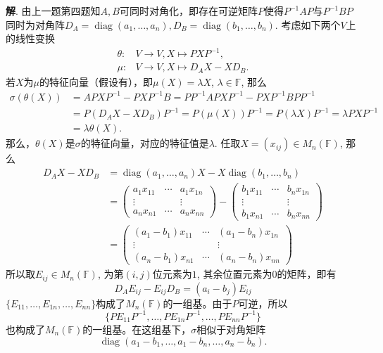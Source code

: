 {\bf 解}. 由上一题第四题知$A,B$可同时对角化，即存在可逆矩阵$P$使得$P^{-1}AP$与$P^{-1}BP$同时为对角阵$D_A = \operatorname{diag}(a_1, \ldots, a_n), D_B = \operatorname{diag}(b_1, \ldots, b_n)$. 考虑如下两个$V$上的线性变换
\begin{align*}
\theta: & V \to V, X \mapsto PXP^{-1},\\
\mu: & V \to V, X \mapsto D_A X - X D_B.
\end{align*}
若$X$为$\mu$的特征向量（假设有），即$\mu(X) = \lambda X$, $\lambda \in \mathbb{F}$, 那么
\begin{align*}
\sigma(\theta(X)) & = A PXP^{-1} - PXP^{-1} B = PP^{-1}APXP^{-1} - PXP^{-1}BPP^{-1} \\
& = P(D_AX - XD_B)P^{-1} = P(\mu(X))P^{-1} = P (\lambda X) P^{-1} = \lambda PXP^{-1} \\
& = \lambda \theta(X).
\end{align*}
那么，$\theta(X)$是$\sigma$的特征向量，对应的特征值是$\lambda$. 任取$X = (x_{ij}) \in M_n (\mathbb{F})$, 那么
\begin{align*}
D_AX - XD_B & = \operatorname{diag}(a_1, \ldots, a_n) X - X \operatorname{diag}(b_1, \ldots, b_n) \\
& = \begin{pmatrix} a_1x_{11} & \cdots & a_1x_{1n} \\ \vdots & & \vdots \\ a_nx_{n1} & \cdots & a_nx_{nn} \end{pmatrix} - \begin{pmatrix} b_1x_{11} & \cdots & b_nx_{1n} \\ \vdots & & \vdots \\ b_1x_{n1} & \cdots & b_nx_{nn} \end{pmatrix} \\
& = \begin{pmatrix} (a_1-b_1)x_{11} & \cdots & (a_1-b_n)x_{1n} \\ \vdots & & \vdots \\ (a_n-b_1)x_{n1} & \cdots & (a_n-b_n)x_{nn} \end{pmatrix}
\end{align*}
所以取$E_{ij} \in M_n (\mathbb{F})$, 为第$(i,j)$位元素为$1$, 其余位置元素为$0$的矩阵，即有
$$D_AE_{ij} - E_{ij}D_B = (a_i-b_j)E_{ij}$$
$\{ E_{11}, \ldots, E_{1n}, \ldots, E_{nn}\}$构成了$M_n (\mathbb{F}) $的一组基。由于$P$可逆，所以
$$\{ PE_{11}P^{-1}, \ldots, PE_{1n}P^{-1}, \ldots, PE_{nn}P^{-1} \}$$
也构成了$M_n (\mathbb{F})$的一组基。在这组基下，$\sigma$相似于对角矩阵
$$\operatorname{diag}(a_1-b_1, \ldots, a_1-b_n, \ldots, a_n-b_n).$$


